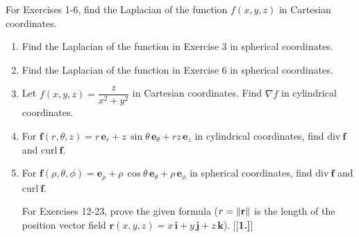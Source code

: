 \centerline{}\label{sec4dot6}
\par\noindent For Exercises 1-6, find the Laplacian of the function $f(x,y,z)$ in Cartesian coordinates.
\begin{enumerate}[\bfseries 1.]
 \item Find the Laplacian of the function in Exercise 3 in spherical coordinates.
 \item Find the Laplacian of the function in Exercise 6 in spherical coordinates.
 \item Let $f(x,y,z) = \dfrac{z}{x^2 + y^2}$ in Cartesian coordinates. Find $\nabla f$ in cylindrical coordinates.
 \item For $\textbf{f}(r,\theta,z) = r\,\textbf{e}_{r} + z\,\sin\theta\,\textbf{e}_{\theta} + rz\,\textbf{e}_{z}$ in
  cylindrical coordinates, find $\text{div}~\textbf{f}$ and $\text{curl}~\textbf{f}$.
 \item For $\textbf{f}(\rho,\theta,\phi) = \textbf{e}_{\rho} + \rho\,\cos\theta\,\textbf{e}_{\theta} +
  \rho\,\textbf{e}_{\phi}$ in spherical coordinates, find $\text{div}~\textbf{f}$ and $\text{curl}~\textbf{f}$.
\par\noindent For Exercises 12-23, prove the given formula ($r = {\left\|\textbf{r}\right\|}$ is the length of the position
vector field $\textbf{r}(x,y,z) = x\,\textbf{i} + y\,\textbf{j} +z\,\textbf{k}$).
[{[\bfseries 1.]}]

\end{enumerate}
